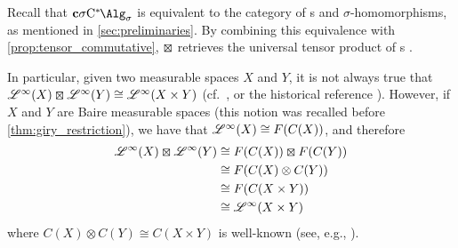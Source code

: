 \begin{remark}\label{rem:tensor_bool}
	Recall that $\cSigmaC$ is equivalent to the category of \bsigma{}s and $\sigma$-homomorphisms, as mentioned in \cref{sec:preliminaries}.
	By combining this equivalence with \cref{prop:tensor_commutative}, $\kocktensor$ retrieves the universal tensor product of \bsigma{}s \cite[Proposition 2.5.1]{fritz2025categories}.

	In particular, given two measurable spaces $X$ and $Y$, it is not always true that $\Linf(X)\kocktensor \Linf(Y)\cong \Linf(X\times Y)$ (cf.~\cite[Example 2.5.6]{fritz2025categories}, or the historical reference \cite[Example 37.A]{sikorski69boolean}).
	However, if $X$ and $Y$ are Baire measurable spaces (this notion was recalled before \cref{thm:giry_restriction}), we have that $\mathscr{L}^{\infty}(X)\cong F(C(X))$, and therefore
	\begin{align*}
		\Linf(X)\kocktensor \Linf(Y) &\cong F(C(X)) \kocktensor F(C(Y)) \\
		& \cong F(C(X)\otimes C(Y)) \\
		& \cong F(C(X\times Y)) \\
		& \cong \Linf(X\times Y)
	\end{align*}
	where $C(X)\otimes C(Y)\cong C(X\times Y)$ is well-known (see, e.g., \cite[Lemma T.6.16]{weggeolsen1993Ktheory}).
\end{remark}

